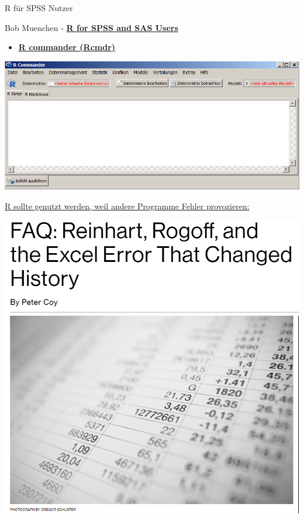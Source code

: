\documentclass[ignorenonframetext,]{beamer}
\providecommand{\tightlist}{%
  \setlength{\itemsep}{0pt}\setlength{\parskip}{0pt}}
\begin{document}
\begin{frame}{R für SPSS Nutzer}
\protect\hypertarget{r-fur-spss-nutzer}{}

\begin{block}{Bob Muenchen -
\href{https://science.nature.nps.gov/im/datamgmt/statistics/r/documents/r_for_sas_spss_users.pdf}{\textbf{R
for SPSS and SAS Users }}}

\begin{itemize}
\tightlist
\item
  \href{http://www.rcommander.com/}{\textbf{R commander (Rcmdr)}}
\end{itemize}

\includegraphics{figure/Rcommanderex.PNG}

\end{block}

\end{frame}

\begin{frame}{\href{https://www.bloomberg.com/news/articles/2013-04-18/faq-reinhart-rogoff-and-the-excel-error-that-changed-history}{R
sollte genutzt werden, weil andere Programme Fehler provozieren:}}
\protect\hypertarget{r-sollte-genutzt-werden-weil-andere-programme-fehler-provozieren}{}

\includegraphics{figure/RheinhartRogoff.PNG}

\end{frame}
\end{document}

